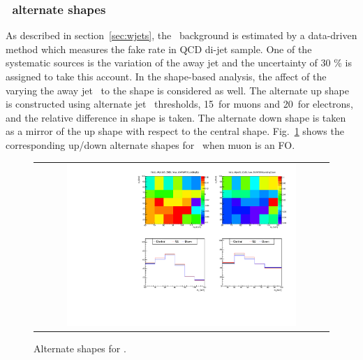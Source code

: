 \subsubsection{\Wjets\ alternate shapes} 

As described in section~\ref{sec:wjets}, the \Wjets\ background is estimated 
by a data-driven method which measures the fake rate in QCD di-jet sample. 
One of the systematic sources is the variation of the away jet \pt
and the uncertainty of 30 \% is assigned to take this account. 
In the shape-based analysis, the affect of the varying the away jet \pt\ 
to the shape is considered as well. 
The alternate up shape is constructed using alternate jet \pt\ thresholds, 
15~\GeV for muons and 20~\GeV for electrons, and the relative difference 
in shape is taken. The alternate down shape is taken as a mirror of 
the up shape with respect to the central shape. 
Fig.~\ref{fig:alter_wjets} shows the corresponding up/down alternate shapes
for \Wjets\ when muon is an FO. 
%
\begin{figure}[htp]
\centering
\begin{tabular}{c}
\includegraphics[width=0.8\textwidth]{figures/histo_WjetsM_CMS_hww_MVAWMBounding_0j_zoom.pdf}
\end{tabular}
\caption{Alternate shapes for \WjetsM. }
\label{fig:alter_wjets}
\end{figure}


